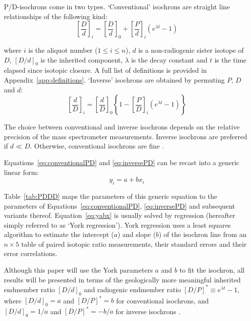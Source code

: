\documentclass{article}
\begin{document}
  P/D-isochrons come in two types. `Conventional' isochrons are
  straight line relationships of the following kind:
  \begin{equation}
    \left[\frac{D}{d}\right]_i =
    \left[\frac{D}{d}\right]_0 +
    \left[\frac{P}{d}\right]_i \left(e^{\lambda{t}}-1\right)
    \label{eq:conventionalPD}
  \end{equation}

  \noindent where $i$ is the aliquot number ($1\leq{i}\leq{n}$), $d$
  is a non-radiogenic sister isotope of $D$, $[D/d]_0$ is the
  inherited component, $\lambda$ is the decay constant and $t$ is the
  time elapsed since isotopic closure. A full list of definitions is
  provided in Appendix~\ref{app:definitions}. `Inverse' isochrons are
  obtained by permuting $P$, $D$ and $d$:
  \begin{equation}
    \left[\frac{d}{D}\right]_i =
    \left[\frac{d}{D}\right]_0
    \left\{
    1 - \left[\frac{P}{D}\right]_i \left(e^{\lambda{t}}-1\right)
    \right\}
    \label{eq:inversePD}
  \end{equation}

  The choice between conventional and inverse isochrons depends on the
  relative precision of the mass spectrometer measurements.  Inverse
  isochrons are preferred if $d\ll{D}$. Otherwise, conventional
  isochrons are fine \citep{li2021}.\medskip

  Equations~\ref{eq:conventionalPD} and \ref{eq:inversePD} can be
  recast into a generic linear form:
  \begin{equation}
    y_i = a + b x_i
    \label{eq:yabx}
  \end{equation}

  Table~\ref{tab:PDDD} maps the parameters of this generic equation to
  the parameters of Equations~\ref{eq:conventionalPD},
  \ref{eq:inversePD} and subsequent variants thereof.
  Equation~\ref{eq:yabx} is usually solved by \citet{york2004}
  regression (hereafter simply referred to as `York regression').
  York regression uses a least squares algorithm to estimate the
  intercept ($a$) and slope ($b$) of the isochron line from an
  $n\times{5}$ table of paired isotopic ratio measurements, their
  standard errors and their error
  correlations.\medskip

  Although this paper will use the York parameters $a$ and $b$ to fit
  the isochron, all results will be presented in terms of the
  geologically more meaningful inherited endmember ratio $[D/d]_0$ and
  radiogenic endmember ratio $[D/P]^\ast\equiv{e}^{\lambda{t}}-1$,
  where $[D/d]_0=a$ and $[D/P]^\ast=b$ for conventional isochrons, and
  $[D/d]_0=1/a$ and $[D/P]^\ast=-b/a$ for inverse isochrons
  \citep{li2021}.\medskip
\end{document}

